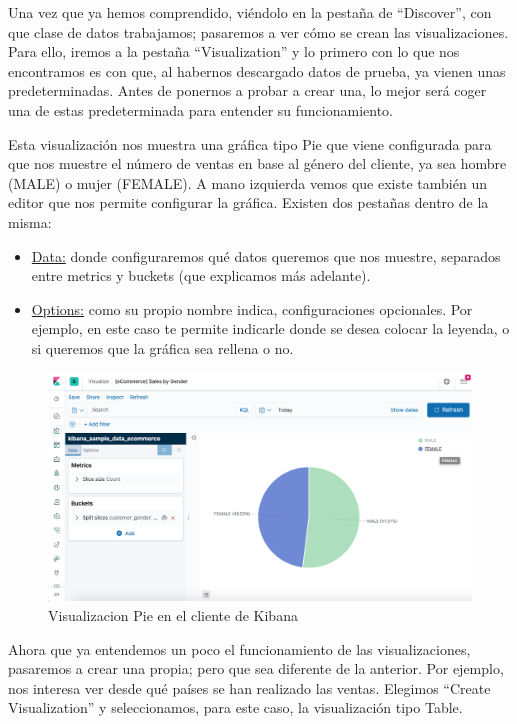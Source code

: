\documentclass[a4paper, 12pt]{book}
\begin{document}
Una vez que ya hemos comprendido, viéndolo en la pestaña de “Discover”, con que clase de datos trabajamos; pasaremos a ver cómo se crean las visualizaciones. Para ello, iremos a la pestaña “Visualization” y lo primero con lo que nos encontramos es con que, al habernos descargado datos de prueba, ya vienen unas predeterminadas. Antes de ponernos a probar a crear una, lo mejor será coger una de estas predeterminada para entender su funcionamiento.

Esta visualización nos muestra una gráfica tipo Pie que viene configurada para que nos muestre el número de ventas en base al género del cliente, ya sea hombre (MALE) o mujer (FEMALE). A mano izquierda vemos que existe también un editor que nos permite configurar la gráfica. Existen dos pestañas dentro de la misma:

\begin{itemize}
    \item \underline{Data:} donde configuraremos qué datos queremos que nos muestre, separados entre metrics y buckets (que explicamos más adelante).
    \item \underline{Options:} como su propio nombre indica, configuraciones opcionales. Por ejemplo, en este caso te permite indicarle donde se desea colocar la leyenda, o si queremos que la gráfica sea rellena o no.
\end{itemize}

\begin{figure}[H]
  \centering
  \includegraphics[width=12cm, keepaspectratio]{img/development/Kibana-visualization-pie.png}
  \caption{Visualizacion Pie en el cliente de Kibana}
  \label{fig:kibanapie}
\end{figure}

Ahora que ya entendemos un poco el funcionamiento de las visualizaciones, pasaremos a crear una propia; pero que sea diferente de la anterior. Por ejemplo, nos interesa ver desde qué países se han realizado las ventas. Elegimos “Create Visualization” y seleccionamos, para este caso, la visualización tipo Table. 
\end{document}
